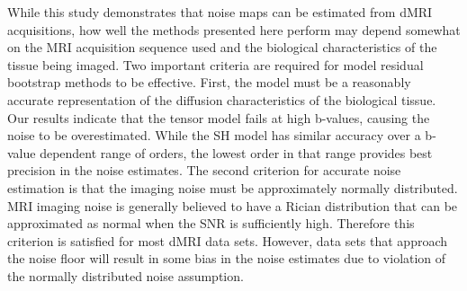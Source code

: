 While this study demonstrates that noise maps can be estimated from dMRI
acquisitions, how well the methods presented here perform may depend
somewhat on the MRI acquisition sequence used and the biological
characteristics of the tissue being imaged. Two important criteria are
required for model residual bootstrap methods to be effective. First,
the model must be a reasonably accurate representation of the diffusion
characteristics of the biological tissue. Our results indicate that the
tensor model fails at high b-values, causing the noise to be
overestimated. While the SH model has similar accuracy over a b-value
dependent range of orders, the lowest order in that range provides best
precision in the noise estimates. The second criterion for accurate
noise estimation is that the imaging noise must be approximately
normally distributed. MRI imaging noise is generally believed to have a
Rician distribution that can be approximated as normal when the SNR is
sufficiently high. Therefore this criterion is satisfied for most dMRI
data sets. However, data sets that approach the noise floor will result
in some bias in the noise estimates due to violation of the normally
distributed noise assumption.
